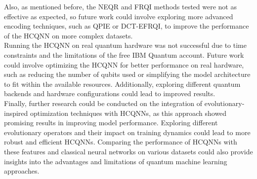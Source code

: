 \documentclass[conference]{IEEEtran}
\begin{document}
\noindent
Also, as mentioned before, the NEQR and FRQI methods tested were not as effective as expected, so future work could involve exploring more advanced encoding techniques, such as QPIE or DCT-EFRQI, to improve the performance of the HCQNN on more complex datasets.\\

\noindent
Running the HCQNN on real quantum hardware was not successful due to time constraints and the limitations of the free IBM Quantum account. Future work could involve optimizing the HCQNN for better performance on real hardware, such as reducing the number of qubits used or simplifying the model architecture to fit within the available resources. Additionally, exploring different quantum backends and hardware configurations could lead to improved results.\\

\noindent
Finally, further research could be conducted on the integration of evolutionary-inspired optimization techniques with HCQNNs, as this approach showed promising results in improving model performance. Exploring different evolutionary operators and their impact on training dynamics could lead to more robust and efficient HCQNNs. Comparing the performance of HCQNNs with these features and classical neural networks on various datasets could also provide insights into the advantages and limitations of quantum machine learning approaches.\\







\end{document}
